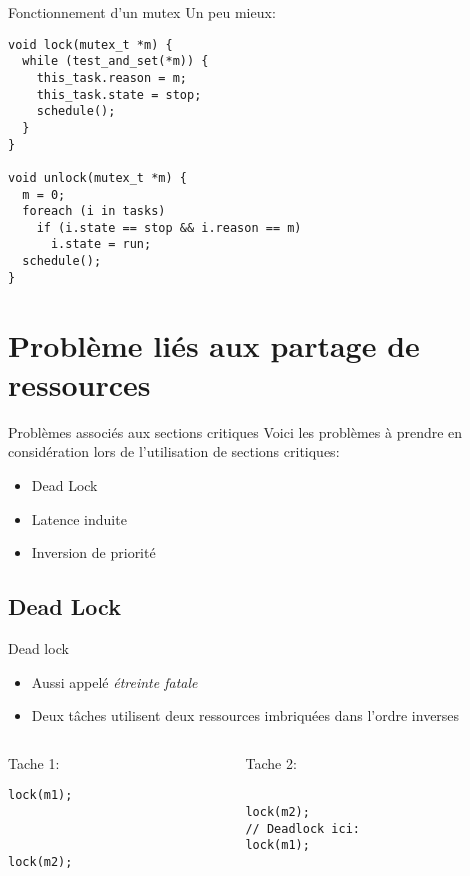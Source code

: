 \begin{frame}[fragile]{Fonctionnement d'un mutex}
  Un peu mieux:
  \begin{lstlisting}
void lock(mutex_t *m) {
  while (test_and_set(*m)) {
    this_task.reason = m;
    this_task.state = stop;
    schedule();
  }
}

void unlock(mutex_t *m) {
  m = 0;
  foreach (i in tasks)
    if (i.state == stop && i.reason == m)
      i.state = run;
  schedule();
}
  \end{lstlisting}
\end{frame}

\section{Problème liés aux partage de ressources}

\begin{frame}{Problèmes associés aux sections critiques}
  Voici les problèmes à prendre en considération lors de l'utilisation
  de sections critiques:
  \begin{itemize}
  \item Dead Lock
  \item Latence induite
  \item Inversion de priorité
  \end{itemize}
\end{frame}

\subsection{Dead Lock}

\begin{frame}[fragile]{Dead lock}
  \begin{itemize}
  \item Aussi appelé \emph{étreinte fatale}
  \item Deux tâches utilisent  deux ressources imbriquées dans l'ordre
    inverses
  \end{itemize}
  \begin{columns}
    \begin{column}{5cm}
      Tache 1:
      \begin{lstlisting}[showlines=true,emptylines=10]
lock(m1);



lock(m2);
      \end{lstlisting}
    \end{column}
    \begin{column}{5cm}
      Tache 2:
      \begin{lstlisting}[showlines=true,emptylines=10]

lock(m2);
// Deadlock ici:
lock(m1);

      \end{lstlisting}
    \end{column}
  \end{columns}
  \begin{center}
    
  \end{center}
\end{frame}

